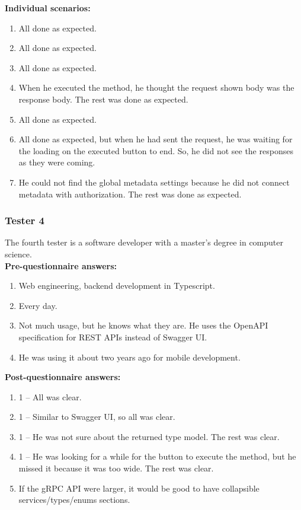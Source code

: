 \textbf{Individual scenarios:}
\begin{enumerate}
    \item All done as expected.
    \item All done as expected.
    \item All done as expected.
    \item When he executed the method, he thought the request shown body was the response body.
    The rest was done as expected.
    \item All done as expected.
    \item All done as expected, but when he had sent the request, he was waiting for the loading on the executed button to end.
    So, he did not see the responses as they were coming.
    \item He could not find the global metadata settings because he did not connect metadata with authorization.
    The rest was done as expected.
\end{enumerate}

\subsubsection{Tester 4}
The fourth tester is a software developer with a master's degree in computer science.\\

\textbf{Pre-questionnaire answers:}
\begin{enumerate}
    \item Web engineering, backend development in Typescript.
    \item Every day.
    \item Not much usage, but he knows what they are.
    He uses the OpenAPI specification for REST APIs instead of Swagger UI\@.
    \item He was using it about two years ago for mobile development.
\end{enumerate}

\textbf{Post-questionnaire answers:}
\begin{enumerate}
    \item 1 -- All was clear.
    \item 1 -- Similar to Swagger UI, so all was clear.
    \item 1 -- He was not sure about the returned type model.
    The rest was clear.
    \item 1 -- He was looking for a while for the button to execute the method, but he missed it because it was too wide.
    The rest was clear.
    \item If the gRPC API were larger, it would be good to have collapsible services/types/enums sections.
\end{enumerate}

